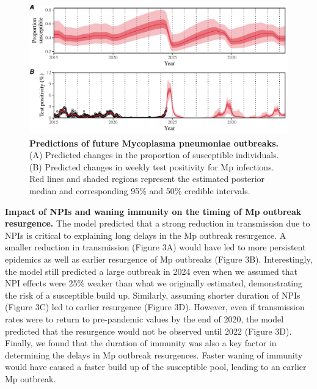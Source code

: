 \documentclass[12pt]{article}
\begin{document}
\begin{figure}[!th]
\includegraphics[width=\textwidth]{../figure2/figure2.pdf}
\caption{
\textbf{Predictions of future Mycoplasma pneumoniae outbreaks.}
(A) Predicted changes in the proportion of susceptible individuals.
(B) Predicted changes in weekly test positivity for Mp infections.
Red lines and shaded regions represent the estimated posterior median and corresponding 95\% and 50\% credible intervals.
}
\end{figure}

\textbf{Impact of NPIs and waning immunity on the timing of Mp outbreak resurgence.}
The model predicted that a strong reduction in transmission due to NPIs is critical to explaining long delays in the Mp outbreak resurgence.
A smaller reduction in transmission (Figure 3A) would have led to more persistent epidemics as well as earlier resurgence of Mp outbreaks (Figure 3B).
Interestingly, the model still predicted a large outbreak in 2024 even when we assumed that NPI effects were 25\% weaker than what we originally estimated, demonstrating the risk of a susceptible build up.
Similarly, assuming shorter duration of NPIs (Figure 3C) led to earlier resurgence (Figure 3D).
However, even if transmission rates were to return to pre-pandemic values by the end of 2020, the model predicted that the resurgence would not be observed until 2022 (Figure 3D).
Finally, we found that the duration of immunity was also a key factor in determining the delays in Mp outbreak resurgences.
Faster waning of immunity would have caused a faster build up of the susceptible pool, leading to an earlier Mp outbreak.
\end{document}
